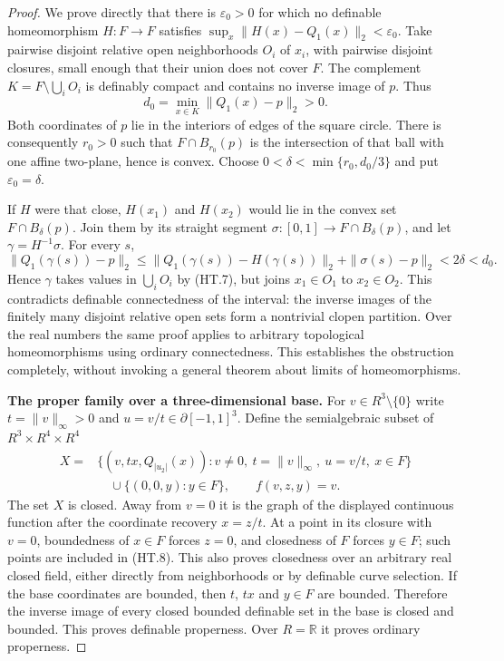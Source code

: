 \begin{proof}
We prove directly that there is $\varepsilon_0>0$ for which no
definable homeomorphism $H:F\to F$ satisfies
$\sup_x\|H(x)-Q_1(x)\|_2<\varepsilon_0$.
Take pairwise disjoint relative open neighborhoods $O_i$ of $x_i$,
with pairwise disjoint closures, small enough that their union does
not cover $F$. The complement
$K=F\setminus\bigcup_i O_i$ is definably compact and contains no
inverse image of $p$. Thus
\[
 d_0=\min_{x\in K}\|Q_1(x)-p\|_2>0.
\tag{HT.7}
\]
Both coordinates of $p$ lie in the interiors of edges of the square
circle. There is consequently $r_0>0$ such that
$F\cap B_{r_0}(p)$ is the intersection of that ball with one affine
two-plane, hence is convex. Choose
$0<\delta<\min\{r_0,d_0/3\}$ and put $\varepsilon_0=\delta$.

If $H$ were that close, $H(x_1)$ and $H(x_2)$ would lie in the
convex set $F\cap B_\delta(p)$. Join them by its straight segment
$\sigma:[0,1]\to F\cap B_\delta(p)$, and let
$\gamma=H^{-1}\sigma$. For every $s$,
\[
 \|Q_1(\gamma(s))-p\|_2
 \le\|Q_1(\gamma(s))-H(\gamma(s))\|_2
       +\|\sigma(s)-p\|_2
 <2\delta<d_0.
\]
Hence $\gamma$ takes values in $\bigcup_i O_i$ by (HT.7), but
joins $x_1\in O_1$ to $x_2\in O_2$. This contradicts definable
connectedness of the interval: the inverse images of the finitely
many disjoint relative open sets form a nontrivial clopen partition.
Over the real numbers the same proof applies to arbitrary topological
homeomorphisms using ordinary connectedness. This establishes the
obstruction completely, without invoking a general theorem about
limits of homeomorphisms.

\textbf{The proper family over a three-dimensional base.}\quad
For $v\in R^3\setminus\{0\}$ write
$t=\|v\|_\infty>0$ and $u=v/t\in\partial[-1,1]^3$.
Define the semialgebraic subset of $R^3\times R^4\times R^4$
\[
\begin{split}
 X={}&\{(v,t x,Q_{|u_2|}(x)):
                v\ne0,\ t=\|v\|_\infty,\ u=v/t,\ x\in F\}\\
 &\quad\cup\{(0,0,y):y\in F\},
 \qquad f(v,z,y)=v.
\end{split}
\tag{HT.8}
\]
The set $X$ is closed. Away from $v=0$ it is the graph of the
displayed continuous function after the coordinate recovery $x=z/t$.
At a point in its closure with $v=0$, boundedness of $x\in F$
forces $z=0$, and closedness of $F$ forces $y\in F$; such points
are included in (HT.8). This also proves closedness over an arbitrary
real closed field, either directly from neighborhoods or by definable
curve selection. If the base coordinates are bounded, then $t$, $t x$
and $y\in F$ are bounded. Therefore the inverse image of every closed
bounded definable set in the base is closed and bounded. This proves
definable properness. Over $R=\mathbb R$ it proves ordinary properness.


\end{proof}
